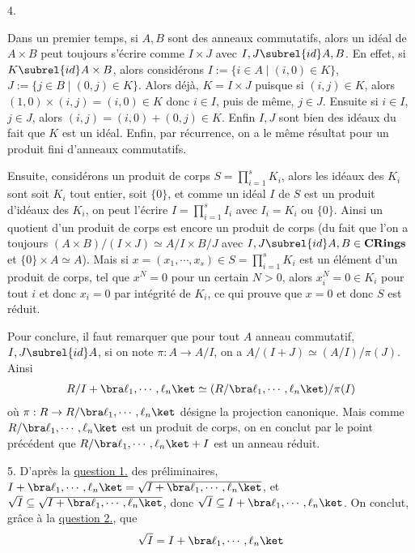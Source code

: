 \documentclass[11pt]{article}
\begin{document}
    \begin{question}{4.}
        \item Dans un premier temps, si $A,B$ sont des anneaux commutatifs, alors un idéal de $A \times B$ peut toujours s'écrire comme $I \times J$ avec $I,J \subrel{id} A,B$. En effet, si $K \subrel{id} A \times B$, alors considérons $I := \{i \in A \mid (i,0) \in K\}$, $J := \{j \in B \mid (0,j) \in  K\}$. Alors déjà, $K = I \times J$ puisque si $(i,j) \in K$, alors $(1,0) \times (i,j) = (i,0) \in K$ donc $i \in I$, puis de même, $j \in J$. Ensuite si $i \in I$, $j \in J$, alors $(i,j) = (i,0) + (0,j) \in K$. Enfin $I,J$ sont bien des idéaux du fait que $K$ est un idéal. Enfin, par récurrence, on a le même résultat pour un produit fini d'anneaux commutatifs.
        \item Ensuite, considérons un produit de corps $S = \prod_{i = 1}^s K_i$, alors les idéaux des $K_i$ sont soit $K_i$ tout entier, soit $\{0\}$, et comme un idéal $I$ de $S$ est un produit d'idéaux des $K_i$, on peut l'écrire $I = \prod_{i = 1}^s I_i$ avec $I_i = K_i$ ou $\{0\}$. Ainsi un quotient d'un produit de corps est encore un produit de corps (du fait que l'on a toujours $(A \times B)/(I \times J) \simeq A/I \times B/J$ avec $I,J \subrel{id} A,B \in \mathbf{CRings}$ et $\{0\} \times A \simeq A$). Mais si $x = (x_1, \cdots, x_s) \in S = \prod_{i = 1}^s K_i$ est un élément d'un produit de corps, tel que $x^N = 0$ pour un certain $N > 0$, alors $x_i^N = 0 \in K_i$ pour tout $i$ et donc $x_i = 0$ par intégrité de $K_i$, ce qui prouve que $x = 0$ et donc $S$ est réduit. 
        \item Pour conclure, il faut remarquer que pour tout $A$ anneau commutatif, $I,J \subrel{id} A$, si on note $\pi : A \to A/I$, on a $A/(I + J) \simeq (A/I)/\pi(J)$. Ainsi 
        \begin{align*}
            R/I + \bra \ell_1, \cdots, \ell_n \ket \simeq (R/\bra \ell_1, \cdots, \ell_n \ket)/\pi(I)
        \end{align*}
        où $\pi : R \to R/\bra \ell_1, \cdots, \ell_n \ket$ désigne la projection canonique. Mais comme $R/\bra \ell_1, \cdots, \ell_n \ket$ est un produit de corps, on en conclut par le point précédent que $R/\bra \ell_1, \cdots, \ell_n \ket + I$ est un anneau réduit.
    \end{question}
    \begin{question}{5.}
        D'après la \hyperref[q11]{question 1.} des préliminaires, $I + \bra \ell_1, \cdots, \ell_n \ket = \sqrt{I + \bra \ell_1, \cdots, \ell_n \ket}$, et $\sqrt{I} \subseteq \sqrt{I + \bra \ell_1, \cdots, \ell_n \ket}$, donc $\sqrt{I} \subseteq I + \bra \ell_1, \cdots, \ell_n \ket$. On conclut, grâce à la \hyperref[q22]{question 2.}, que
        \begin{align*}
            \sqrt{I} = I + \bra \ell_1, \cdots, \ell_n \ket
        \end{align*}
    \end{question}
\end{document}
